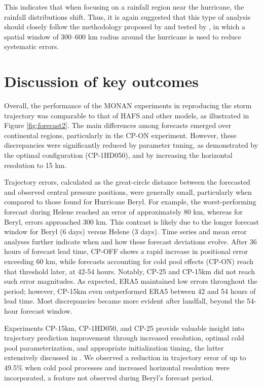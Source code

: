 This indicates that when focusing on a rainfall region near the hurricane, the rainfall distributions shift. Thus, it is again suggested that this type of analysis should closely follow the methodology proposed by  and tested by , in which a spatial window of 300–600 km radius around the hurricane is used to reduce systematic errors.


\section{Discussion of key outcomes}

Overall, the performance of the MONAN experiments in reproducing the storm trajectory was comparable to that of HAFS and other models, as illustrated in Figure \ref{fig:forecast2}. The main differences among forecasts emerged over continental regions, particularly in the CP-ON experiment. However, these discrepancies were significantly reduced by parameter tuning, as demonstrated by the optimal configuration (CP-1HD050), and by increasing the horizontal resolution to 15 km.

Trajectory errors, calculated as the great-circle distance between the forecasted and observed central pressure positions, were generally small, particularly when compared to those found for Hurricane Beryl. For example, the worst-performing forecast during Helene reached an error of approximately 80 km, whereas for Beryl, errors approached 300 km. This contrast is likely due to the longer forecast window for Beryl (6 days) versus Helene (3 days). Time series and mean error analyses further indicate when and how these forecast deviations evolve. After 36 hours of forecast lead time, CP-OFF shows a rapid increase in positional error exceeding 60 km, while forecasts accounting for cold pool effects (CP-ON) reach that threshold later, at 42-54 hours. Notably, CP-25 and CP-15km did not reach such error magnitudes. As expected, ERA5 maintained low errors throughout the period; however, CP-15km even outperformed ERA5 between 42 and 54 hours of lead time. Most discrepancies became more evident after landfall, beyond the 54-hour forecast window.

Experiments CP-15km, CP-1HD050, and CP-25 provide valuable insight into trajectory prediction improvement through increased resolution, optimal cold pool parameterization, and appropriate initialization timing, the latter extensively discussed in . We observed a reduction in trajectory error of up to 49.5\% when cold pool processes and increased horizontal resolution were incorporated, a feature not observed during Beryl's forecast period. 

